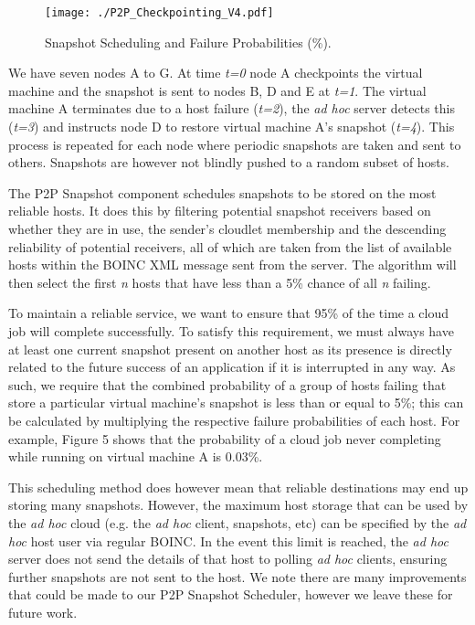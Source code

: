\documentclass[10pt, conference, compsocconf]{IEEEtran}
\begin{document}
\begin{figure}[h!]
  \begin{center}
\texttt{[image: ./P2P\_Checkpointing\_V4.pdf]}
  \end{center}
\caption{Snapshot Scheduling and Failure Probabilities (\%).}
\end{figure}

\noindent We have seven nodes A to G. At time \textit{t=0} node A checkpoints the virtual machine and the snapshot is sent to nodes B, D and E at \textit{t=1}. The virtual machine A terminates due to a host failure (\textit{t=2}), the \textit{ad hoc} server detects this (\textit{t=3}) and instructs node D to restore virtual machine A's snapshot (\textit{t=4}). This process is repeated for each node where periodic snapshots are taken and sent to others. Snapshots are however not blindly pushed to a random subset of hosts.

The P2P Snapshot component schedules snapshots to be stored on the most reliable hosts. It does this by filtering potential snapshot receivers based on whether they are in use, the sender's cloudlet membership and the descending reliability of potential receivers, all of which are taken from the list of available hosts within the BOINC XML message sent from the server. The algorithm will then select the first \textit{n} hosts that have less than a 5\% chance of all \textit{n} failing.

To maintain a reliable service, we want to ensure that 95\% of the time a cloud job will complete successfully. To satisfy this requirement, we must always have at least one current snapshot present on another host as its presence is directly related to the future success of an application if it is interrupted in any way. As such, we require that the combined probability of a group of hosts failing that store a particular virtual machine's snapshot is less than or equal to 5\%; this can be calculated by multiplying the respective failure probabilities of each host. For example, Figure 5 shows that the probability of a cloud job never completing while running on virtual machine A is 0.03\%. 

This scheduling method does however mean that reliable destinations may end up storing many snapshots. However, the maximum host storage that can be used by the \textit{ad hoc} cloud (e.g. the \textit{ad hoc} client, snapshots, etc) can be specified by the \textit{ad hoc} host user via regular BOINC. In the event this limit is reached, the \textit{ad hoc} server does not send the details of that host to polling \textit{ad hoc} clients, ensuring further snapshots are not sent to the host. We note there are many improvements that could be made to our P2P Snapshot Scheduler, however we leave these for future work.
\end{document}
